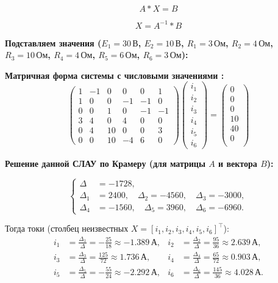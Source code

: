 $$A * X = B$$

$$X = A^{-1} * B$$

\textbf{Подставляем значения ($E_1=30\,\text{В}$, $E_2=10\,\text{В}$, $R_1=3\,\text{Ом}$, $R_2=4\,\text{Ом}$, $R_3=10\,\text{Ом}$, $R_4=4\,\text{Ом}$, $R_5=6\,\text{Ом}$, $R_6=3\,\text{Ом}$):}


\textbf{Матричная форма системы с числовыми значениями :}
$$\begin{pmatrix}
1 & -1 &  0 &  0 &  0 & 1 \\
 1 &  0 &  0 & -1 & -1 &  0 \\
 0 &  0 & 1 &  0 & -1 &  -1 \\
 3 & 4 & 0 &  4 &  0 &  0 \\
 0 &  4 & 10 & 0 & 0 &  3 \\
 0 &  0 &  10 &  -4 &  6 &  0
\end{pmatrix}

\begin{pmatrix}
i_1 \\
i_2 \\
i_3 \\
i_4 \\
 i_5 \\
i_6
\end{pmatrix}
=
\begin{pmatrix}
0 \\
0 \\
0 \\
10 \\
40 \\
0 \\
\end{pmatrix}$$


\textbf{Решение данной СЛАУ по Крамеру (для матрицы $A$ и вектора $B$):}

\[
\left\{\begin{aligned}
\Delta   &= -1728,\\
\Delta_1 &= 2400,\quad \Delta_2 = -4560,\quad \Delta_3 = -3000,\\
\Delta_4 &= -1560,\quad \Delta_5 = 3960,\quad \Delta_6 = -6960.
\end{aligned}\right.
\]

Тогда токи (столбец неизвестных $X=[i_1,i_2,i_3,i_4,i_5,i_6]^\top$):
\[
\begin{aligned}
 i_1 &= \frac{\Delta_1}{\Delta} = -\frac{25}{18} \approx -1.389\,\text{А}, &
 i_2 &= \frac{\Delta_2}{\Delta} = \frac{95}{36} \approx 2.639\,\text{А}, \\
 i_3 &= \frac{\Delta_3}{\Delta} = \frac{125}{72} \approx 1.736\,\text{А}, &
 i_4 &= \frac{\Delta_4}{\Delta} = \frac{65}{72} \approx 0.903\,\text{А}, \\
 i_5 &= \frac{\Delta_5}{\Delta} = -\frac{55}{24} \approx -2.292\,\text{А}, &
 i_6 &= \frac{\Delta_6}{\Delta} = \frac{145}{36} \approx 4.028\,\text{А}.
\end{aligned}
\]

